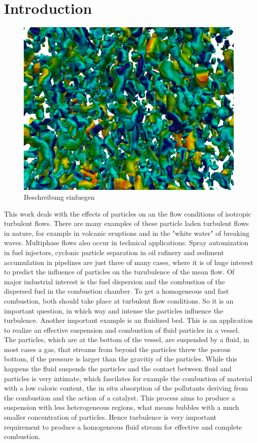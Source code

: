 \documentclass[11pt,a4paper,openany,oneside,parskip=half*]{article}
\begin{document}
\section{Introduction}
\begin{figure}[h]
	\centering
  \includegraphics[width=\textwidth]{./Abbildungen/64_velocity.png}
	\caption{Beschreibung einfuegen}
	\label{introuction_picture}
\end{figure}
This work deals with the effects of particles on an the flow conditions of isotropic turbulent flows.
There are many examples of these particle laden turbulent flows in nature, for example in volcanic eruptions and in the "white water" of breaking waves.
\newline
Multiphase flows also occur in technical applications. Spray automization in fuel injectors, cyclonic particle separation in oil rafinery and sediment accumulation in pipelines are just three of many cases, where it is of huge interest to predict the influence of particles on the turubulence of the mean flow.
Of major industrial interest is the fuel dispersion and the combustion of the dispersed fuel in the combustion chamber. To get a homogeneous and fast combustion, both should take place at turbulent flow conditions. So it is an important question, in which way and intense the particles influence the turbulence.
\newline
Another important example is an fluidized bed. This is an application to realize an effective suspension and combustion of fluid particles in a vessel. The particles, which are at the bottom of the vessel, are suspended by a fluid, in most cases a gas, that streams from beyond the particles threw the porous bottom, if the pressure is larger than the gravitiy of the particles. While this happens the fluid suspends the particles and the contact between fluid and particles is very intimate, which fascilates for example the combustion of material with a low caloric content, the in situ absorption of the pollutants deriving from the combustion and the action of a catalyst. This process aims to produce a suspension with less heterogeneous regions, what means bubbles with a much smaller concentration of particles. Hence turbulence is very important requirement to produce a homogeneous fluid stream for effective and complete combustion.
\end{document}
